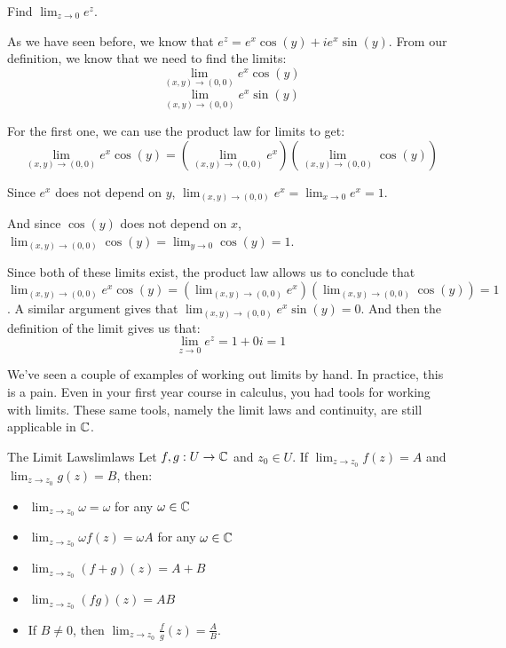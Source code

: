 \begin{ex}{}{} Find $\lim_{z\rightarrow 0} e^z$.

As we have seen before, we know that $e^z = e^x\cos(y) + ie^x\sin(y)$. From our definition, we know that we need to find the limits:
$$\lim_{(x,y)\rightarrow(0,0)} e^x\cos(y)$$
$$\lim_{(x,y)\rightarrow(0,0)} e^x\sin(y)$$

For the first one, we can use the product law for limits to get:
$$\lim_{(x,y)\rightarrow (0,0)}e^x\cos(y) = \left(\lim_{(x,y)\rightarrow (0,0)}e^x\right)\left(\lim_{(x,y)\rightarrow (0,0)} \cos(y)\right)$$

Since $e^x$ does not depend on $y$, $\lim_{(x,y)\rightarrow (0,0)}e^x = \lim_{x\rightarrow 0}e^x = 1$.

And since $\cos(y)$ does not depend on $x$, $\lim_{(x,y)\rightarrow (0,0)} \cos(y) = \lim_{y\rightarrow 0} \cos(y) = 1$.

Since both of these limits exist, the product law allows us to conclude that $\lim_{(x,y)\rightarrow (0,0)}e^x\cos(y) = \left(\lim_{(x,y)\rightarrow (0,0)}e^x\right)\left(\lim_{(x,y)\rightarrow (0,0)} \cos(y)\right) = 1$. A similar argument gives that $\lim_{(x,y)\rightarrow(0,0)} e^x\sin(y) = 0$. And then the definition of the limit gives us that:
$$\lim_{z\rightarrow 0}e^z = 1 + 0i = 1$$
\end{ex}

We've seen a couple of examples of working out limits by hand. In practice, this is a pain. Even in your first year course in calculus, you had tools for working with limits. These same tools, namely the limit laws and continuity, are still applicable in $\mathbb{C}$.

\begin{thmbo}{The Limit Laws}{limlaws}
Let $f,g:U \rightarrow \mathbb{C}$ and $z_0\in U$. If $\lim_{z\rightarrow z_0} f(z) = A$ and $\lim_{z\rightarrow z_0} g(z) = B$, then:

\begin{itemize}
\item $\lim_{z\rightarrow z_0} \omega = \omega$ for any $\omega \in \mathbb{C}$
\item $\lim_{z\rightarrow z_0} \omega f(z) = \omega A$ for any $\omega \in \mathbb{C}$
\item $\lim_{z\rightarrow z_0} (f+g)(z) = A + B$
\item $\lim_{z\rightarrow z_0} (fg)(z) = AB$
\item If $B\ne 0$, then $\lim_{z\rightarrow z_0} \frac{f}{g}(z) = \frac{A}{B}$.
\end{itemize}
\end{thmbo}

